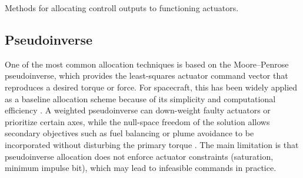 Methods for allocating controll outputs to functioning actuators. 

\subsection{Pseudoinverse}
One of the most common allocation techniques is based on the Moore–Penrose pseudoinverse, which provides the least-squares actuator command vector that reproduces a desired torque or force. For spacecraft, this has been widely applied as a baseline allocation scheme because of its simplicity and computational efficiency \cite{Johansen2013ControlSurvey,Shen2015Inertia-freeAllocation}. A weighted pseudoinverse can down-weight faulty actuators or prioritize certain axes, while the null-space freedom of the solution allows secondary objectives such as fuel balancing or plume avoidance to be incorporated without disturbing the primary torque \cite{Durham1993ConstrainedAllocation}. The main limitation is that pseudoinverse allocation does not enforce actuator constraints (saturation, minimum impulse bit), which may lead to infeasible commands in practice.

\now



